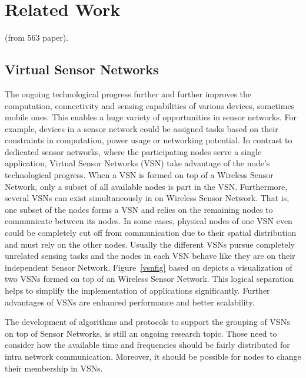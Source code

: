 \chapter{Related Work}

(from 563 paper).

\section{Virtual Sensor Networks}
The ongoing technological progress further and further improves the computation, connectivity and sensing capabilities of various devices, sometimes mobile ones. \cite{Jayasumana} This enables a huge variety of opportunities in sensor networks. For example, devices in a sensor network could be assigned tasks based on their constraints in computation, power usage or networking potential. In contrast to dedicated sensor networks, where the participating nodes serve a single application, Virtual Sensor Networks (VSN) take advantage of the node’s technological progress. When a VSN is formed on top of a Wireless Sensor Network, only a subset of all available nodes is part in the VSN. Furthermore, several VSNs can exist simultaneously in on Wireless Sensor Network. \cite{Jayasumana} That is, one subset of the nodes forms a VSN and relies on the remaining nodes to communicate between its nodes. In some cases, physical nodes of one VSN even could be completely cut off from communication due to their spatial distribution and must rely on the other nodes. Usually the different VSNs pursue completely unrelated sensing tasks and the nodes in each VSN behave like they are on their independent Sensor Network. Figure~\ref{vsnfig} based on \cite{Jayasumana} depicts a visualization of two VSNs formed on top of an Wireless Sensor Network. This logical separation helps to simplify the implementation of applications significantly. \cite{Jayasumana} Further advantages of VSNs are enhanced performance and better scalability.

The development of algorithms and protocols to support the grouping of VSNs on top of Sensor Networks, is still an ongoing research topic. Those need to consider how the available time and frequencies should be fairly distributed for intra network communication. Moreover, it should be possible for nodes to change their membership in VSNs.



